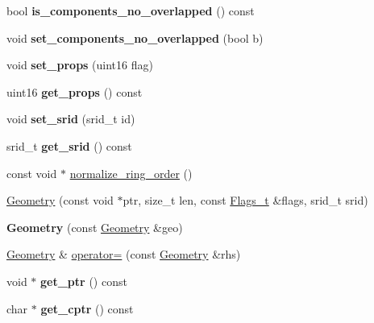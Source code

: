 \begin{DoxyCompactItemize}
bool {\bfseries is\+\_\+components\+\_\+no\+\_\+overlapped} () const
\item 
\mbox{\label{classGeometry_adf4e56545c4fe6d3d9d82b071e2b8153}} 
void {\bfseries set\+\_\+components\+\_\+no\+\_\+overlapped} (bool b)
\item 
\mbox{\label{classGeometry_aac78ae988796dbd7109b925ee4e9fb7a}} 
void {\bfseries set\+\_\+props} (uint16 flag)
\item 
\mbox{\label{classGeometry_a71e9ac1496eabc3ceacf8283a4fbef79}} 
uint16 {\bfseries get\+\_\+props} () const
\item 
\mbox{\label{classGeometry_a391a87bf3c3b1df6b9d5346483619d4e}} 
void {\bfseries set\+\_\+srid} (srid\+\_\+t id)
\item 
\mbox{\label{classGeometry_ad4c45ad41b1f2137f64e1b06e32f92c3}} 
srid\+\_\+t {\bfseries get\+\_\+srid} () const
\item 
const void $\ast$ \mbox{\hyperlink{classGeometry_add33b390178c8ff8ec6cc3d2309c9bd6}{normalize\+\_\+ring\+\_\+order}} ()
\item 
\mbox{\hyperlink{classGeometry_a8e5288eb91de90ed6fe16d1a61aebd18}{Geometry}} (const void $\ast$ptr, size\+\_\+t len, const \mbox{\hyperlink{classGeometry_1_1Flags__t}{Flags\+\_\+t}} \&flags, srid\+\_\+t srid)
\item 
\mbox{\label{classGeometry_a8e26b168baf3dc79fde314b056a7b5f4}} 
{\bfseries Geometry} (const \mbox{\hyperlink{classGeometry}{Geometry}} \&geo)
\item 
\mbox{\hyperlink{classGeometry}{Geometry}} \& \mbox{\hyperlink{classGeometry_a16062a3b3460f9c217bd766b68770a1b}{operator=}} (const \mbox{\hyperlink{classGeometry}{Geometry}} \&rhs)
\item 
\mbox{\label{classGeometry_accbbd9151676948d1f686d04bd64f628}} 
void $\ast$ {\bfseries get\+\_\+ptr} () const
\item 
\mbox{\label{classGeometry_acf2bd2a674ce12b701c7dbeb96750865}} 
char $\ast$ {\bfseries get\+\_\+cptr} () const
\item 
\mbox{\label{classGeometry_a198b47df8f0784cb6649a7e8066a28cd}} 

\end{DoxyCompactItemize}
